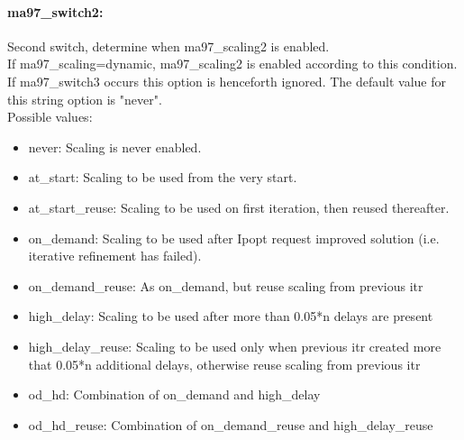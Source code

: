 \paragraph{ma97\_switch2:}\label{opt:ma97_switch2} Second switch, determine when ma97\_scaling2 is enabled. \\
 If ma97\_scaling=dynamic, ma97\_scaling2 is enabled according to this condition. If ma97\_switch3 occurs this option is henceforth ignored. The default value for this string option is "never".
\\ 
Possible values:
\begin{itemize}
   \item never: Scaling is never enabled.
   \item at\_start: Scaling to be used from the very start.
   \item at\_start\_reuse: Scaling to be used on first iteration, then reused thereafter.
   \item on\_demand: Scaling to be used after Ipopt request improved solution (i.e. iterative refinement has failed).
   \item on\_demand\_reuse: As on\_demand, but reuse scaling from previous itr
   \item high\_delay: Scaling to be used after more than 0.05*n delays are present
   \item high\_delay\_reuse: Scaling to be used only when previous itr created more that 0.05*n additional delays, otherwise reuse scaling from previous itr
   \item od\_hd: Combination of on\_demand and high\_delay
   \item od\_hd\_reuse: Combination of on\_demand\_reuse and high\_delay\_reuse
\end{itemize}

